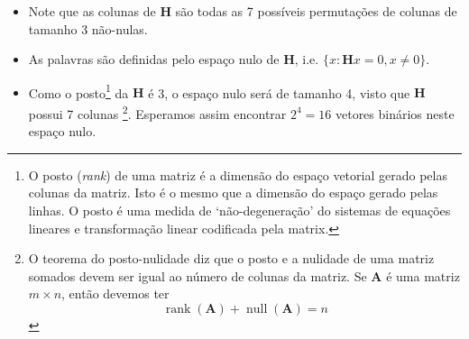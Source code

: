 \begin{frame}[allowframebreaks]
\begin{itemize}
  \item Note que as colunas de $\mathbf{H}$ são todas as 7 possíveis permutações de colunas de tamanho 3 não-nulas.
  \item As palavras são definidas pelo espaço nulo de $\mathbf{H}$, i.e. $\{x : \mathbf{H}x = 0 , x \neq 0 \}$.
  \item Como o posto\footnote{
	O posto (\textit{rank}) de uma matriz é a dimensão do espaço vetorial gerado pelas colunas da matriz. Isto
	é o mesmo que a dimensão do espaço gerado pelas linhas. O posto é uma medida de `não-degeneração' 
	do sistemas de equações lineares e transformação linear codificada pela matrix.
	} da $\mathbf{H}$ é 3, o espaço nulo será de tamanho 4, visto que $\mathbf{H}$ possui 7 colunas
	\footnote{
	O teorema do posto-nulidade diz que o posto e a nulidade de uma matriz somados devem ser igual ao número de colunas da matriz.
	Se $\mathbf{A}$ é uma matriz $m \times n$, então devemos ter
		\begin{equation}
		\operatorname{rank}(\mathbf{A}) + \operatorname{null}(\mathbf{A}) = n
		\end{equation}
	}. Esperamos assim encontrar $2^4 = 16$ vetores binários neste espaço nulo.
  \end{itemize}
\end{frame}

